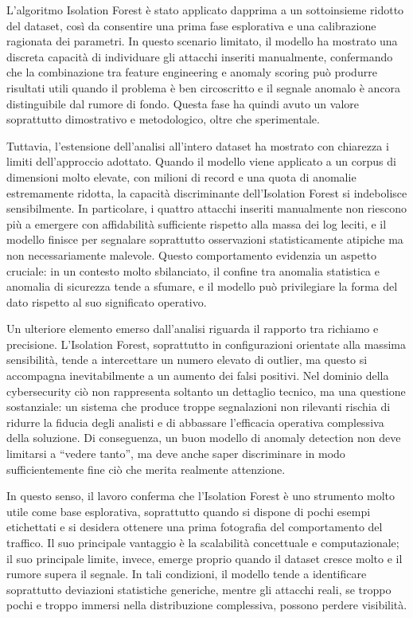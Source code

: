 L’algoritmo Isolation Forest è stato applicato dapprima a un sottoinsieme ridotto del dataset, così da consentire una prima fase esplorativa e una calibrazione ragionata dei parametri. In questo scenario limitato, il modello ha mostrato una discreta capacità di individuare gli attacchi inseriti manualmente, confermando che la combinazione tra feature engineering e anomaly scoring può produrre risultati utili quando il problema è ben circoscritto e il segnale anomalo è ancora distinguibile dal rumore di fondo. Questa fase ha quindi avuto un valore soprattutto dimostrativo e metodologico, oltre che sperimentale.

Tuttavia, l’estensione dell’analisi all’intero dataset ha mostrato con chiarezza i limiti dell’approccio adottato. Quando il modello viene applicato a un corpus di dimensioni molto elevate, con milioni di record e una quota di anomalie estremamente ridotta, la capacità discriminante dell’Isolation Forest si indebolisce sensibilmente. In particolare, i quattro attacchi inseriti manualmente non riescono più a emergere con affidabilità sufficiente rispetto alla massa dei log leciti, e il modello finisce per segnalare soprattutto osservazioni statisticamente atipiche ma non necessariamente malevole. Questo comportamento evidenzia un aspetto cruciale: in un contesto molto sbilanciato, il confine tra anomalia statistica e anomalia di sicurezza tende a sfumare, e il modello può privilegiare la forma del dato rispetto al suo significato operativo.

Un ulteriore elemento emerso dall’analisi riguarda il rapporto tra richiamo e precisione. L’Isolation Forest, soprattutto in configurazioni orientate alla massima sensibilità, tende a intercettare un numero elevato di outlier, ma questo si accompagna inevitabilmente a un aumento dei falsi positivi. Nel dominio della cybersecurity ciò non rappresenta soltanto un dettaglio tecnico, ma una questione sostanziale: un sistema che produce troppe segnalazioni non rilevanti rischia di ridurre la fiducia degli analisti e di abbassare l’efficacia operativa complessiva della soluzione. Di conseguenza, un buon modello di anomaly detection non deve limitarsi a “vedere tanto”, ma deve anche saper discriminare in modo sufficientemente fine ciò che merita realmente attenzione.

In questo senso, il lavoro conferma che l’Isolation Forest è uno strumento molto utile come base esplorativa, soprattutto quando si dispone di pochi esempi etichettati e si desidera ottenere una prima fotografia del comportamento del traffico. Il suo principale vantaggio è la scalabilità concettuale e computazionale; il suo principale limite, invece, emerge proprio quando il dataset cresce molto e il rumore supera il segnale. In tali condizioni, il modello tende a identificare soprattutto deviazioni statistiche generiche, mentre gli attacchi reali, se troppo pochi e troppo immersi nella distribuzione complessiva, possono perdere visibilità.

